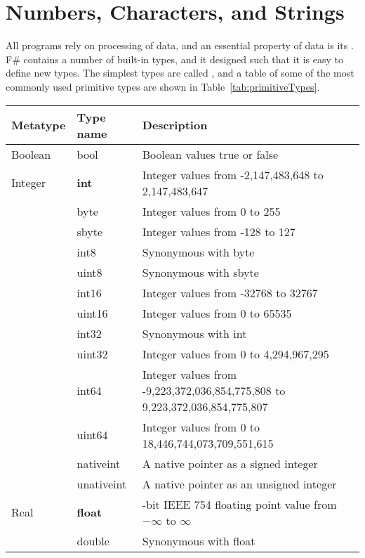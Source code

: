 \chapter{Numbers, Characters, and Strings}
All programs rely on processing of data, and an essential property of data is its . F\# contains a number of built-in types, and it designed such that it is easy to define new types. The simplest types are called , and a table of some of the most commonly used primitive types are shown in Table~\ref{tab:primitiveTypes}.
\begin{table}
  \centering
  \begin{tabularx}{\textwidth}{|l|l|>{\raggedright\arraybackslash}X|}
    \hline
    Metatype & Type name & Description\\
    \hline
    Boolean & bool & Boolean values true or false \\
    \hline
    Integer & \textbf{int} & Integer values from -2,147,483,648 to 2,147,483,647 \\
             & byte &Integer values from 0 to 255\\
             & sbyte &Integer values from -128 to 127\\
             & int8 &Synonymous with byte\\
             & uint8 &Synonymous with sbyte\\
             & int16 &Integer values from -32768 to 32767\\
             & uint16 &Integer values from 0 to 65535\\
             & int32 &Synonymous with int\\
             & uint32 & Integer values from 0 to 4,294,967,295\\
             & int64 &Integer values from -9,223,372,036,854,775,808 to 9,223,372,036,854,775,807\\
             & uint64 &Integer values from 0 to 18,446,744,073,709,551,615\\
             & nativeint &A native pointer as a signed integer\\
             & unativeint &A native pointer as an unsigned integer\\
    \hline
    Real &\textbf{float} & 64-bit IEEE 754 floating point value from $-\infty$ to $\infty$\\
             & double & Synonymous with float\\

\end{tabularx}
\end{table}
